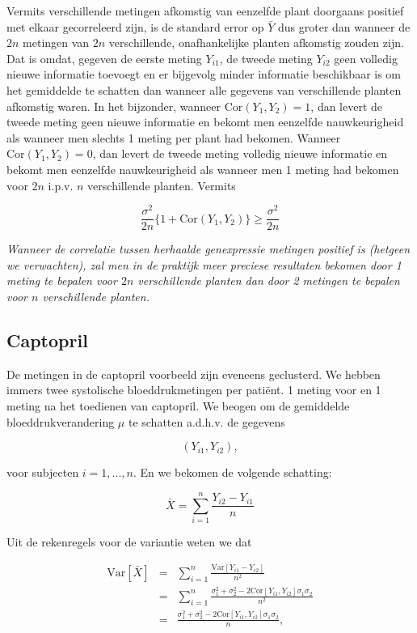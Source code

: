 \documentclass[
  12pt,dutch,coursenotes]{book}
\theoremstyle{definition}
\theoremstyle{definition}
\theoremstyle{definition}
\theoremstyle{remark}
\begin{document}
Vermits verschillende metingen afkomstig van eenzelfde plant doorgaans
positief met elkaar gecorreleerd zijn, is de standard error op \(\bar Y\) dus
groter dan wanneer de \(2n\) metingen van \(2n\) verschillende, onafhankelijke
planten afkomstig zouden zijn. Dat is omdat, gegeven de eerste meting \(Y_{i1}\), de tweede meting \(Y_{i2}\) geen volledig nieuwe informatie toevoegt en er bijgevolg minder informatie beschikbaar is om het gemiddelde te
schatten dan wanneer alle gegevens van verschillende planten afkomstig
waren. In het bijzonder, wanneer \(\text{Cor}(Y_{1},Y_{2})=1\), dan levert de tweede meting geen nieuwe informatie en bekomt men eenzelfde nauwkeurigheid als wanneer men slechts 1 meting per plant had bekomen. Wanneer \(\text{Cor}(Y_{1},Y_{2})=0\), dan levert de tweede meting volledig nieuwe informatie en bekomt men eenzelfde nauwkeurigheid als wanneer men 1 meting had bekomen voor \(2n\) i.p.v. \(n\) verschillende planten. Vermits

\[\frac{\sigma^2}{2n}\{1+\text{Cor}(Y_{1},Y_{2})\}\geq \frac{\sigma^2}{2n}\]

\emph{Wanneer de correlatie tussen herhaalde genexpressie metingen positief is (hetgeen we verwachten), zal men in de praktijk meer preciese resultaten bekomen door 1 meting te bepalen voor \(2n\) verschillende planten dan door 2 metingen te bepalen voor \(n\) verschillende planten.}

\hypertarget{captopril}{%
\subsection{Captopril}\label{captopril}}

De metingen in de captopril voorbeeld zijn eveneens geclusterd. We hebben immers twee systolische bloeddrukmetingen per patiënt.
1 meting voor en 1 meting na het toedienen van captopril.
We beogen om de gemiddelde bloeddrukverandering \(\mu\) te schatten a.d.h.v. de gegevens

\[(Y_{i1} , Y_{i2}),\]

voor subjecten \(i = 1, ..., n\).
En we bekomen de volgende schatting:

\[\bar X = \sum_{i=1}^n \frac{Y_{i2}-Y_{i1}}{n}\]

Uit de rekenregels voor de variantie weten we dat

\begin{eqnarray*}
\text{Var}\left[\bar X\right]&=&\sum_{i=1}^n \frac{\text{Var}\left[Y_{i1}-Y_{i2}\right]}{n^2}\\
&=&\sum_{i=1}^n \frac{\sigma^2_1+\sigma^2_2-2\text{Cor}\left[Y_{i1},Y_{i2}\right]\sigma_1\sigma_2}{n^2}\\
&=&\frac{\sigma^2_1+\sigma^2_2-2\text{Cor}\left[Y_{i1},Y_{i2}\right]\sigma_1\sigma_2}{n},\\
\end{eqnarray*}
\end{document}
